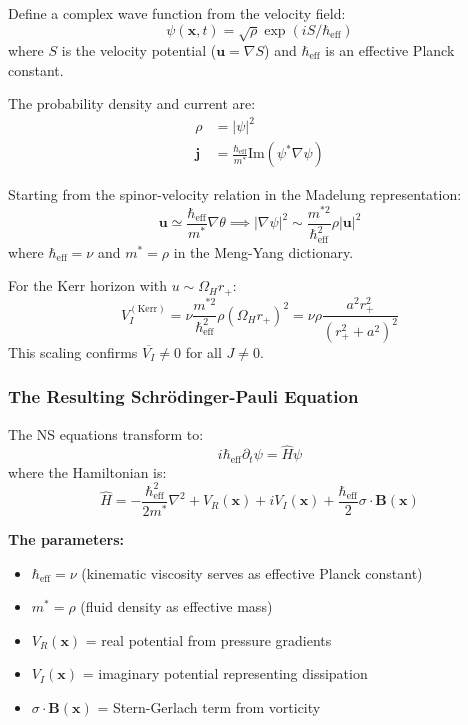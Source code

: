 \documentclass[11pt]{article}
\begin{document}
Define a complex wave function from the velocity field:
\begin{equation}
\psi(\mathbf{x},t) = \sqrt{\rho} \exp(iS/\hbar_{\text{eff}})
\end{equation}
where $S$ is the velocity potential ($\mathbf{u} = \nabla S$) and $\hbar_{\text{eff}}$ is an effective Planck constant.

The probability density and current are:
\begin{align}
\rho &= |\psi|^2 \\
\mathbf{j} &= \frac{\hbar_{\text{eff}}}{m^*} \text{Im}(\psi^* \nabla \psi)
\end{align}

Starting from the spinor-velocity relation in the Madelung representation:
\begin{equation}
\mathbf{u} \simeq \frac{\hbar_{\text{eff}}}{m^*}\nabla\theta \implies |\nabla\psi|^2 \sim \frac{m^{*2}}{\hbar_{\text{eff}}^2}\rho|\mathbf{u}|^2
\end{equation}
where $\hbar_{\text{eff}} = \nu$ and $m^* = \rho$ in the Meng-Yang dictionary.

For the Kerr horizon with $u \sim \Omega_H r_+$:
\begin{equation}
V_I^{(\text{Kerr})} = \nu\frac{m^{*2}}{\hbar_{\text{eff}}^2}\rho(\Omega_H r_+)^2 = \nu\rho\frac{a^2 r_+^2}{(r_+^2 + a^2)^2}
\end{equation}
This scaling confirms $\overline{V_I} \neq 0$ for all $J \neq 0$.

\subsubsection{The Resulting Schrödinger-Pauli Equation}

The NS equations transform to:
\begin{equation}
i\hbar_{\text{eff}} \partial_t \psi = \hat{H}\psi
\end{equation}
where the Hamiltonian is:
\begin{equation}
\hat{H} = -\frac{\hbar^2_{\text{eff}}}{2m^*} \nabla^2 + V_R(\mathbf{x}) + iV_I(\mathbf{x}) + \frac{\hbar_{\text{eff}}}{2}\sigma \cdot \mathbf{B}(\mathbf{x})
\end{equation}

\textbf{The parameters:}
\begin{itemize}
\item $\hbar_{\text{eff}} = \nu$ (kinematic viscosity serves as effective Planck constant)
\item $m^* = \rho$ (fluid density as effective mass)
\item $V_R(\mathbf{x})$ = real potential from pressure gradients
\item $V_I(\mathbf{x})$ = imaginary potential representing dissipation
\item $\sigma \cdot \mathbf{B}(\mathbf{x})$ = Stern-Gerlach term from vorticity
\end{itemize}
\end{document}
